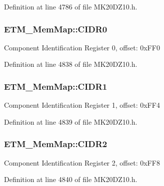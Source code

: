 Definition at line 4786 of file M\+K20\+D\+Z10.\+h.

\subsubsection[{\texorpdfstring{C\+I\+D\+R0}{CIDR0}}]{ E\+T\+M\+\_\+\+Mem\+Map\+::\+C\+I\+D\+R0}\hypertarget{struct_e_t_m___mem_map_a289eea9e2103e42ed73809a60b78a83c}{}\label{struct_e_t_m___mem_map_a289eea9e2103e42ed73809a60b78a83c}
Component Identification Register 0, offset\+: 0x\+F\+F0 

Definition at line 4838 of file M\+K20\+D\+Z10.\+h.

\subsubsection[{\texorpdfstring{C\+I\+D\+R1}{CIDR1}}]{ E\+T\+M\+\_\+\+Mem\+Map\+::\+C\+I\+D\+R1}\hypertarget{struct_e_t_m___mem_map_abc79da95babee680c540cbbc4cfa35fe}{}\label{struct_e_t_m___mem_map_abc79da95babee680c540cbbc4cfa35fe}
Component Identification Register 1, offset\+: 0x\+F\+F4 

Definition at line 4839 of file M\+K20\+D\+Z10.\+h.

\subsubsection[{\texorpdfstring{C\+I\+D\+R2}{CIDR2}}]{ E\+T\+M\+\_\+\+Mem\+Map\+::\+C\+I\+D\+R2}\hypertarget{struct_e_t_m___mem_map_ad374b6ac57c02483f0c5a5ad2db6dd5e}{}\label{struct_e_t_m___mem_map_ad374b6ac57c02483f0c5a5ad2db6dd5e}
Component Identification Register 2, offset\+: 0x\+F\+F8 

Definition at line 4840 of file M\+K20\+D\+Z10.\+h.

